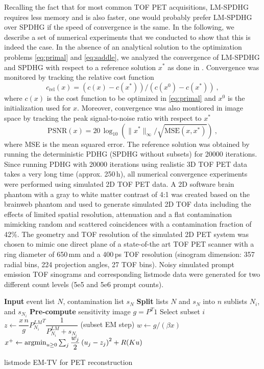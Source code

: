 Recalling the fact that for most common TOF PET acquisitions, LM-SPDHG requires less memory and 
is also faster, one would probably prefer LM-SPDHG over SPDHG if the speed of convergence is the same.
In the following, we describe a set of numerical experiments that we conducted to show that this
is indeed the case.
In the absence of an analytical solution to the optimization problems \eqref{eq:primal}
and \eqref{eq:saddle}, we analyzed the convergence of LM-SPDHG and SPDHG with respect to a 
reference solution $x^*$ as done in \cite{Ehrhardt2019}.
Convergence was monitored by tracking the relative cost function
\begin{equation}
c_\text{rel}(x) = (c(x) - c(x^*)) / (c(x^0) - c(x^*)) \ ,
\end{equation}
where $c(x)$ is the cost function to be optimized in \eqref{eq:primal} and $x^0$ is the initialization
used for $x$.
Moreover, convergence was also montiored in image space by tracking the peak signal-to-noise ratio
with respect to $x^*$
\begin{equation}
\text{PSNR}(x) = 20\,\log_{10} \left( \|x^*\|_\infty/\sqrt{\text{MSE}(x,x^*)} \right) \ ,
\end{equation}
where MSE is the mean squared error.
The reference solution was obtained by running the deterministic PDHG (SPDHG without subsets)
for 20000 iterations.
Since running PDHG with 20000 iterations using realistic 3D TOF PET data takes a very long 
time (approx. 250\,h), all numerical convergence experiments were performed using simulated 2D TOF PET data.
A 2D software brain phantom with a gray to white matter contrast of 4:1 was created
based on the brainweb phantom \cite{Collins1998} and used to generate simulated 2D TOF data 
including the effects of limited spatial resolution, attenuation and a flat contamination mimicking 
random and scattered coincidences with a contamination fraction of 42\%.
The geometry and TOF resolution of the simulated 2D PET system was chosen to 
mimic one direct plane of a state-of-the art TOF PET scanner with a ring diameter of 650\,mm
and a 400\,ps TOF resolution
(sinogram dimension: 357 radial bins, 224 projection angles, 27 TOF bins).
Noisy simulated prompt emission TOF sinograms and corresponding listmode data were generated
for two different count levels (5e5 and 5e6 prompt counts).

\begin{algorithm}[t]
\begin{algorithmic}[1]
\small
\State \textbf{Input} event list $N$, contamination list $s_N$
\State \textbf{Split} lists $N$ and $s_N$ into $n$ sublists $N_i$, and $s_{N_i}$
\State \textbf{Pre-compute} sensitivity image $g = P^T 1$
\Repeat
	\State Select subset $i$
	\State $z \gets \dfrac{x\,n}{g} {P_{N_i}^{LM}}^T \dfrac{1}{P_{N_i}^{LM} + s_{N_i}}$ (subset EM step)
  \State $w \gets g / (\beta x)$
  \State $x^+ \gets \operatorname*{argmin}_{u\geq 0} \sum_j \dfrac{w_j}{2} \left(u_j -z_j \right)^2 + R(Ku)$
\State {}
\end{algorithmic}
\caption{listmode EM-TV for PET reconstruction \cite{Sawatzky2008, Burger2008}}
\label{alg:emtv}
\end{algorithm}

